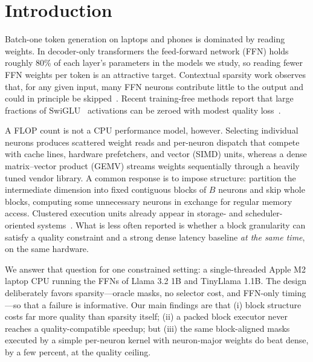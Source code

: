 \section{Introduction}

Batch-one token generation on laptops and phones is dominated by reading
weights. In decoder-only transformers the feed-forward network (FFN) holds
roughly 80\% of each layer's parameters in the models we study, so reading
fewer FFN weights per token is an attractive target. Contextual sparsity work
observes that, for any given input, many FFN neurons contribute little to the
output and could in principle be skipped~\cite{dejavu,lazyneuron}. Recent
training-free methods report that large fractions of SwiGLU~\cite{glu}
activations can be zeroed with modest quality loss~\cite{cats,teal}.

A FLOP count is not a CPU performance model, however. Selecting individual
neurons produces scattered weight reads and per-neuron dispatch that compete
with cache lines, hardware prefetchers, and vector (SIMD) units, whereas a
dense matrix--vector product (GEMV) streams weights sequentially through a
heavily tuned vendor library. A common response is to impose structure:
partition the intermediate dimension into fixed contiguous blocks of $B$
neurons and skip whole blocks, computing some unnecessary neurons in exchange
for regular memory access. Clustered execution units already appear in
storage- and scheduler-oriented systems~\cite{llmflash,powerinfer2}. What is
less often reported is whether a block granularity can satisfy a quality
constraint and a strong dense latency baseline \emph{at the same time}, on the
same hardware.

We answer that question for one constrained setting: a single-threaded Apple
M2 laptop CPU running the FFNs of Llama 3.2 1B and TinyLlama 1.1B. The design
deliberately favors sparsity---oracle masks, no selector cost, and FFN-only
timing---so that a failure is informative. Our main findings are that
(i) block structure costs far more quality than sparsity itself;
(ii) a packed block executor never reaches a quality-compatible speedup; but
(iii) the same block-aligned masks executed by a simple per-neuron kernel with
neuron-major weights do beat dense, by a few percent, at the quality ceiling.

